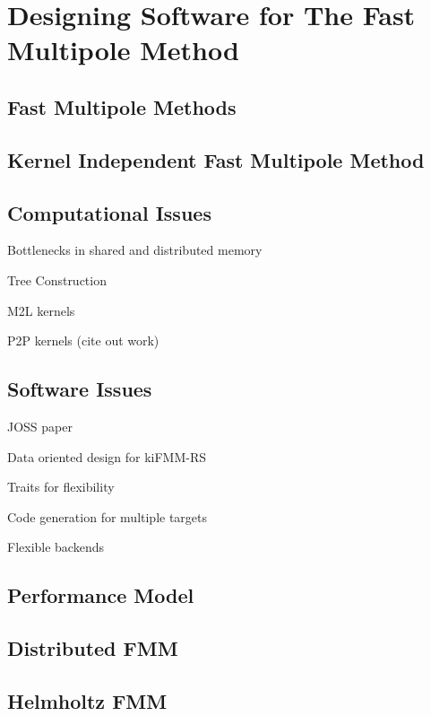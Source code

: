 \chapter{Designing Software for The Fast Multipole Method}\label{chpt:2:designing_software_for_fast_algorithms}
\thispagestyle{chaptertitle} %

\section{Fast Multipole Methods}

\section{Kernel Independent Fast Multipole Method}

\section{Computational Issues}

Bottlenecks in shared and distributed memory

Tree Construction

M2L kernels

P2P kernels (cite out work)


\section{Software Issues}

JOSS paper

Data oriented design for kiFMM-RS

Traits for flexibility

Code generation for multiple targets

Flexible backends

\section{Performance Model}



\section{Distributed FMM}

\section{Helmholtz FMM}


% 
% 
% 
% 